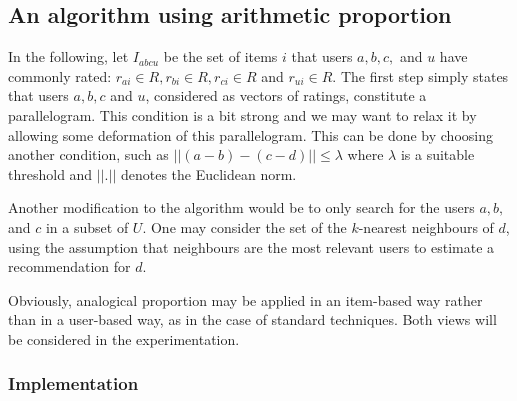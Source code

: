 \subsection{An algorithm using arithmetic proportion}
In the following, let $I_{abcu}$ be the set of items $i$ that users $a, b, c,$
and $u$ have commonly rated: $r_{ai} \in R, r_{bi} \in R, r_{ci} \in R$ and
$r_{ui}\in R$.
The first step simply states that users $a, b, c$ and $u$, considered as
vectors of ratings, constitute a parallelogram.  This condition is a bit strong
and we may want to relax it by allowing some deformation of this parallelogram.
This can be done by choosing another condition, such as $||(a-b) - (c-d)|| \leq
\lambda$ where $\lambda$ is a suitable threshold and $||.||$ denotes the
Euclidean norm.

Another modification to the algorithm would be to only search for the users
$a, b,$ and $c$ in a subset of $U$. One may consider the set of the $k$-nearest
neighbours of $d$, using the assumption that neighbours are the most relevant
users to estimate a recommendation for $d$.

Obviously, analogical proportion may be applied in an item-based way rather
than in a user-based way, as in the case of standard techniques. Both views
will be considered in the experimentation.

\subsubsection{Implementation}

